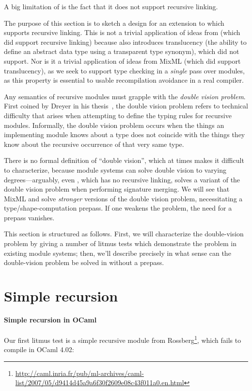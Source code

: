 A big limitation of \Backpack{} is the fact that it does not support
recursive linking.  

The purpose of this section is to sketch a design for an extension to
\Backpack{} which supports recursive linking.  This is not a trivial
application of ideas from \OldBackpack{} (which did support recursive linking)
because \Backpack{} also introduces translucency (the ability to define
an abstract data type using a transparent type synonym), which \OldBackpack{}
did not support.  Nor is it a trivial application of ideas from MixML
(which did support translucency), as we seek to support type checking
in a \emph{single} pass over modules, as this property is essential
to usable recompilation avoidance in a real compiler.

Any semantics of recursive modules must grapple with the \emph{double
vision problem}.  First coined by Dreyer in his
thesis~\cite{dreyer:thesis}, the double vision problem refers to
technical difficulty that arises when attempting to define the typing
rules for recursive modules.  Informally, the double vision problem
occurs when the things an implementing module knows about a type does
not coincide with the things they know about the recursive occurrence of
that very same type.

There is no formal definition of ``double vision'', which at times makes
it difficult to characterize, because module systems can solve double
vision to varying degrees---arguably, even \Backpack{}, which has no
recursive linking, solves a variant of the double vision problem when
performing signature merging.  We will see that MixML and \OldBackpack{}
solve \emph{stronger} versions of the double vision problem, necessitating
a type/shape-computation prepass.  If one weakens the problem, the
need for a prepass vanishes.

This section is structured as follows.  First, we will characterize the
double-vision problem by giving a number of litmus tests which
demonstrate the problem in existing module systems; then, we'll describe
precisely in what sense can the double-vision problem be solved in
\Backpack{} without a prepass.

\section{Simple recursion}

\paragraph{Simple recursion in OCaml}  Our first litmus test is a simple
recursive module from Rossberg\footnote{\url{http://caml.inria.fr/pub/ml-archives/caml-list/2007/05/d9414d45a9a6f30f2609e08c43f011a0.en.html}}, which fails to compile in OCaml 4.02:

